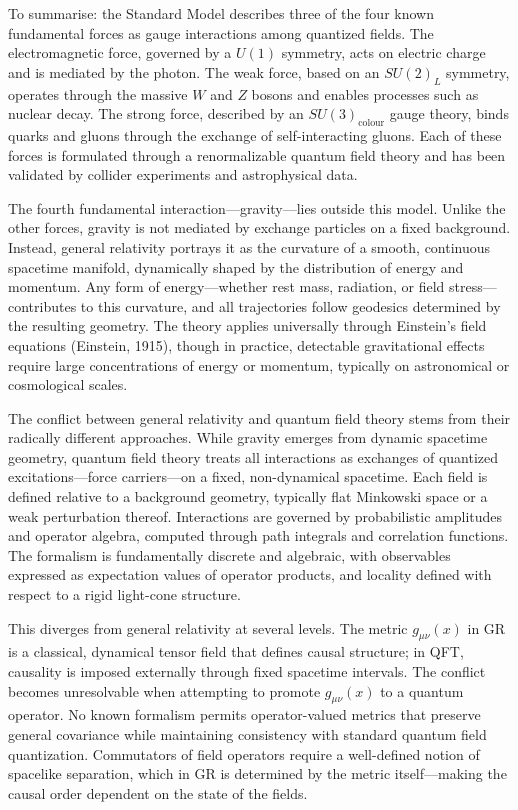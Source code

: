 To summarise: the Standard Model describes three of the four known fundamental forces as gauge interactions among quantized fields. The electromagnetic force, governed by a $U(1)$ symmetry, acts on electric charge and is mediated by the photon. The weak force, based on an $SU(2)_L$ symmetry, operates through the massive $W$ and $Z$ bosons and enables processes such as nuclear decay. The strong force, described by an $SU(3)_\text{colour}$ gauge theory, binds quarks and gluons through the exchange of self-interacting gluons. Each of these forces is formulated through a renormalizable quantum field theory and has been validated by collider experiments and astrophysical data.

The fourth fundamental interaction—gravity—lies outside this model. Unlike the other forces, gravity is not mediated by exchange particles on a fixed background. Instead, general relativity portrays it as the curvature of a smooth, continuous spacetime manifold, dynamically shaped by the distribution of energy and momentum. Any form of energy—whether rest mass, radiation, or field stress—contributes to this curvature, and all trajectories follow geodesics determined by the resulting geometry. The theory applies universally through Einstein's field equations (Einstein, 1915), though in practice, detectable gravitational effects require large concentrations of energy or momentum, typically on astronomical or cosmological scales.

The conflict between general relativity and quantum field theory stems from their radically different approaches. While gravity emerges from dynamic spacetime geometry, quantum field theory treats all interactions as exchanges of quantized excitations—force carriers—on a fixed, non-dynamical spacetime. Each field is defined relative to a background geometry, typically flat Minkowski space or a weak perturbation thereof. Interactions are governed by probabilistic amplitudes and operator algebra, computed through path integrals and correlation functions. The formalism is fundamentally discrete and algebraic, with observables expressed as expectation values of operator products, and locality defined with respect to a rigid light-cone structure.

This diverges from general relativity at several levels. The metric $g_{\mu\nu}(x)$ in GR is a classical, dynamical tensor field that defines causal structure; in QFT, causality is imposed externally through fixed spacetime intervals. The conflict becomes unresolvable when attempting to promote $g_{\mu\nu}(x)$ to a quantum operator. No known formalism permits operator-valued metrics that preserve general covariance while maintaining consistency with standard quantum field quantization. Commutators of field operators require a well-defined notion of spacelike separation, which in GR is determined by the metric itself—making the causal order dependent on the state of the fields.

